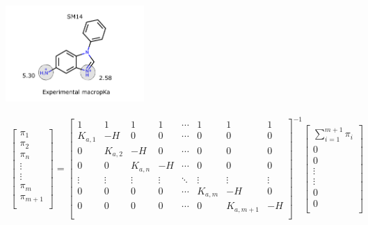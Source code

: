\documentclass[9pt,lineno,final]{elife}
\begin{document}
\begin{figure}[H]
	\centering
	
	\includegraphics[width=0.47\textwidth]{Images/Molecules/SM14-pka.pdf} \hfill
	
	\begin{gather*}
\begin{bmatrix} \pi_{1} \\ \pi_{2} \\ \pi_{n} \\ \vdots \\ \vdots \\ \pi_{m} \\ \pi_{m+1}\\ \end{bmatrix}
=
\begin{bmatrix}
 1       & 1       & 1       & 1       & \cdots    & 1& 1  & 1 \\
 K_{a,1} & -H      & 0       & 0       & \cdots    & 0&0  & 0 \\
 0       & K_{a,2} & -H      & 0       & \cdots    & 0&0  & 0 \\
 0       & 0       & K_{a,n} & -H      & \cdots    & 0&0  & 0 \\  
 \vdots  & \vdots  & \vdots  & \vdots  & \ddots    & \vdots & \vdots  & \vdots \\
 0       & 0       & 0       & 0       & \cdots    & K_{a,m} & -H & 0 \\  
 0       & 0       & 0       & 0       & \cdots    &         0    & K_{a,m+1}   & -H \\
\end{bmatrix}^{-1}
\begin{bmatrix} \sum_{i=1}^{m+1} \pi_i \\ 0 \\ 0 \\ \vdots \\ \vdots \\ 0 \\ 0\\ \end{bmatrix}\\

\end{gather*}
\end{figure}
\end{document}
